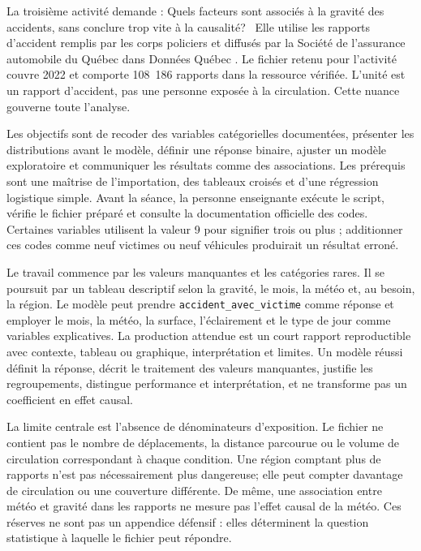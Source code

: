 La troisième activité demande : \og Quels facteurs sont associés à la gravité des accidents, sans conclure trop vite à la causalité? \fg~Elle utilise les rapports d'accident remplis par les corps policiers et diffusés par la Société de l'assurance automobile du Québec dans Données Québec \cite{saaq}. Le fichier retenu pour l'activité couvre 2022 et comporte 108~186 rapports dans la ressource vérifiée. L'unité est un rapport d'accident, pas une personne exposée à la circulation. Cette nuance gouverne toute l'analyse.

Les objectifs sont de recoder des variables catégorielles documentées, présenter les distributions avant le modèle, définir une réponse binaire, ajuster un modèle exploratoire et communiquer les résultats comme des associations. Les prérequis sont une maîtrise de l'importation, des tableaux croisés et d'une régression logistique simple. Avant la séance, la personne enseignante exécute le script, vérifie le fichier préparé et consulte la documentation officielle des codes. Certaines variables utilisent la valeur 9 pour signifier \og trois ou plus \fg; additionner ces codes comme neuf victimes ou neuf véhicules produirait un résultat erroné.

Le travail commence par les valeurs manquantes et les catégories rares. Il se poursuit par un tableau descriptif selon la gravité, le mois, la météo et, au besoin, la région. Le modèle peut prendre \texttt{accident\_avec\_victime} comme réponse et employer le mois, la météo, la surface, l'éclairement et le type de jour comme variables explicatives. La production attendue est un court rapport reproductible avec contexte, tableau ou graphique, interprétation et limites. Un modèle réussi définit la réponse, décrit le traitement des valeurs manquantes, justifie les regroupements, distingue performance et interprétation, et ne transforme pas un coefficient en effet causal.

La limite centrale est l'absence de dénominateurs d'exposition. Le fichier ne contient pas le nombre de déplacements, la distance parcourue ou le volume de circulation correspondant à chaque condition. Une région comptant plus de rapports n'est pas nécessairement plus dangereuse; elle peut compter davantage de circulation ou une couverture différente. De même, une association entre météo et gravité dans les rapports ne mesure pas l'effet causal de la météo. Ces réserves ne sont pas un appendice défensif : elles déterminent la question statistique à laquelle le fichier peut répondre.

